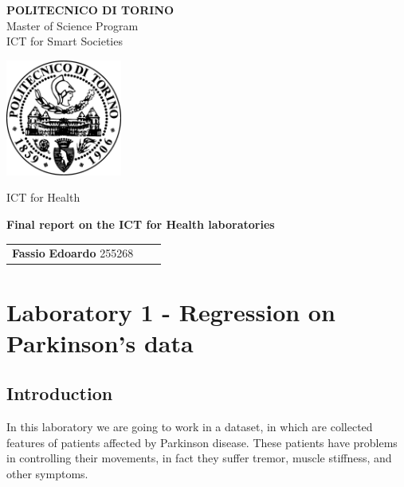 \documentclass[12pt,a4paper,oneside]{article}
\begin{document}
	\renewcommand{\partname}{Laboratory}
	\thispagestyle{empty}
	\null \vfill
	\begin{center}
		\LARGE{\textbf{POLITECNICO DI TORINO}}\\\vspace{0.3in}
		\Large{Master of Science Program}\\
		\Large{ICT for Smart Societies}\\\vspace{0.3in}
	\end{center}
	\begin{center}
		\vspace{0.3in}
		\includegraphics[width=1.5in]{poli_logo.png}
	\end{center}
	\begin{center}
		\vspace{0.3in}	
		\large{
			ICT for Health}
	\end{center}
	\begin{center}
		\vspace{0.3in}	
		\LARGE{\bfseries{Final report on the
				ICT for Health laboratories}}
	\end{center}
	\begin{center}
		\vspace{0.6in}	
		\begin{tabular}{rrl}
		 \large{\textbf{Fassio}} \large{\textbf{Edoardo}} 
		\large{255268} 
		\end{tabular}
	\end{center}
	\vfill \null
\pagebreak

	\renewcommand{\thepage}{\roman{page}}
	\setcounter{page}{1}

\section{Laboratory 1 - Regression on Parkinson's data}
	\subsection{Introduction}
	In this laboratory we are going to work in a dataset, in which are collected features of patients affected by Parkinson disease. These patients have problems in controlling their movements, in fact they suffer tremor, muscle stiffness, and other symptoms.
	
\end{document}
